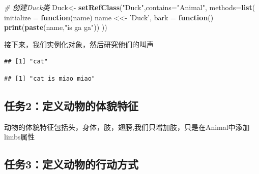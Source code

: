 \documentclass[]{book}
\newenvironment{Shaded}{\begin{snugshade}}{\end{snugshade}}
\newcommand{\KeywordTok}[1]{\textcolor[rgb]{0.13,0.29,0.53}{\textbf{#1}}}
\newcommand{\DataTypeTok}[1]{\textcolor[rgb]{0.13,0.29,0.53}{#1}}
\newcommand{\StringTok}[1]{\textcolor[rgb]{0.31,0.60,0.02}{#1}}
\newcommand{\CommentTok}[1]{\textcolor[rgb]{0.56,0.35,0.01}{\textit{#1}}}
\newcommand{\ControlFlowTok}[1]{\textcolor[rgb]{0.13,0.29,0.53}{\textbf{#1}}}
\newcommand{\OperatorTok}[1]{\textcolor[rgb]{0.81,0.36,0.00}{\textbf{#1}}}
\newcommand{\NormalTok}[1]{#1}
\begin{document}
\begin{Shaded}
\begin{Highlighting}[]
\CommentTok{# 创建Duck类}
\NormalTok{Duck<-}\StringTok{ }\KeywordTok{setRefClass}\NormalTok{(}\StringTok{"Duck"}\NormalTok{,}\DataTypeTok{contains=}\StringTok{"Animal"}\NormalTok{,}
                   \DataTypeTok{methods=}\KeywordTok{list}\NormalTok{(}
                     \DataTypeTok{initialize =} \ControlFlowTok{function}\NormalTok{(name) name <<-}\StringTok{ 'Duck'}\NormalTok{,}
                     \DataTypeTok{bark =} \ControlFlowTok{function}\NormalTok{() }\KeywordTok{print}\NormalTok{(}\KeywordTok{paste}\NormalTok{(name,}\StringTok{"is ga ga"}\NormalTok{))}
\NormalTok{                   ))}
\end{Highlighting}
\end{Shaded}

接下来，我们实例化对象，然后研究他们的叫声

\begin{Shaded}
\end{Shaded}

\begin{verbatim}
## [1] "cat"
\end{verbatim}

\begin{Shaded}
\end{Shaded}

\begin{verbatim}
## [1] "cat is miao miao"
\end{verbatim}

\subsection{任务2：定义动物的体貌特征}\label{2}

动物的体貌特征包括头，身体，肢，翅膀,我们只增加肢，只是在Animal中添加limbs属性

\subsection{任务3：定义动物的行动方式}\label{3}
\end{document}
